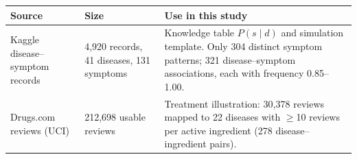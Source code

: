 \begin{tabularx}{\textwidth}{@{}p{3.4cm}p{3.3cm}>{\raggedright\arraybackslash}X@{}}
\toprule
Source & Size & Use in this study \\
\midrule
Kaggle disease--symptom records & 4,920 records, 41 diseases, 131 symptoms & Knowledge table $P(s\mid d)$ and simulation template. Only 304 distinct symptom patterns; 321 disease--symptom associations, each with frequency 0.85--1.00. \\
Drugs.com reviews (UCI) & 212,698 usable reviews & Treatment illustration: 30,378 reviews mapped to 22 diseases with $\geq$10 reviews per active ingredient (278 disease--ingredient pairs). \\
\bottomrule
\end{tabularx}
